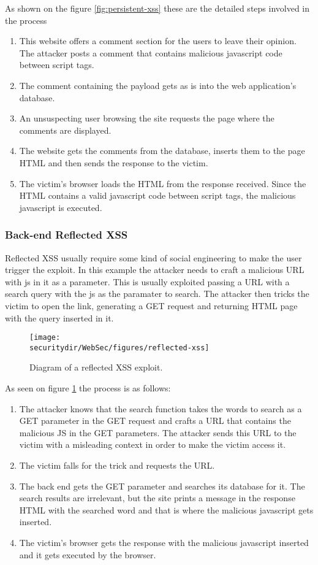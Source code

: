 As shown on the figure \ref{fig:persistent-xss} these are the detailed steps involved in the process
\begin{enumerate}
  \item This website offers a comment section for the users to leave their opinion. The attacker posts a comment that contains malicious javascript code between script tags.
  \item The comment containing the payload gets as is into the web application's database.
  \item An unsuspecting user browsing the site requests the page where the comments are displayed.
  \item The website gets the comments from the database, inserts them to the page HTML and then sends the response to the victim.
  \item The victim's browser loads the HTML from the response received. Since the HTML contains a valid javascript code between script tags, the malicious javascript is executed.
\end{enumerate}


\subsubsection{Back-end Reflected XSS}
Reflected XSS usually require some kind of social engineering to make the user trigger the exploit. In this example the attacker needs to craft a malicious URL with js in it as a parameter. This is usually exploited passing a URL with a search query with the js as the paramater to search. The attacker then tricks the victim to open the link, generating a GET request and returning HTML page with the query inserted in it.

\begin{figure}[htb]
	\begin{centering}
		\texttt{[image: \\securitydir/WebSec/figures/reflected-xss]}
		\par\end{centering}
	\caption{\label{fig:reflected-xss} Diagram of a reflected XSS exploit.}
\end{figure}

As seen on figure \ref{fig:reflected-xss} the process is as follows:
\begin{enumerate}
  \item The attacker knows that the search function takes the words to search as a GET parameter in the GET request and crafts a URL that contains the malicious JS in the GET parameters. The attacker sends this URL to the victim with a misleading context in order to make the victim access it.
  \item The victim falls for the trick and requests the URL.
  \item The back end gets the GET parameter and searches its database for it. The search results are irrelevant, but the site prints a message in the response HTML with the searched word and that is where the malicious javascript gets inserted.
  \item The victim's browser gets the response with the malicious javascript inserted and it gets executed by the browser.
\end{enumerate}

